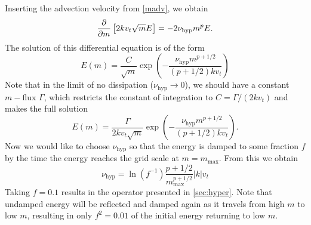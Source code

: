 \documentclass{jpp}
\begin{document}
{Inserting the advection velocity from \cref{madv}, we obtain
\begin{equation}
     \frac{\partial }{\partial m}\left[2 k v_t \sqrt{m} E\right] = - 2 \nu_\mathrm{hyp} m^p E.
\end{equation}
The solution of this differential equation is of the form
\begin{equation}
    E(m) = \frac{C}{\sqrt{m}} \exp\left({-\frac{\nu_\mathrm{hyp} m^{p+1/2}}{(p+1/2)k v_t}}\right)
\end{equation}
Note that in the limit of no dissipation ($\nu_\mathrm{hyp}\rightarrow 0$), we should have a constant $m-$flux $\Gamma$, which restricts the constant of integration to $C=\Gamma/(2k v_t)$ and makes the full solution
\begin{equation}
    E(m) = \frac{\Gamma}{2k v_t\sqrt{m}} \exp\left({-\frac{\nu_\mathrm{hyp} m^{p+1/2}}{(p+1/2)k v_t}}\right).
\end{equation}
Now we would like to choose $\nu_\mathrm{hyp}$ so that the energy is damped to some fraction $f$ by the time the energy reaches the grid scale at $m=m_\mathrm{max}$. From this we obtain
\begin{equation}
    \nu_\mathrm{hyp} = \ln(f^{-1}) \frac{p+1/2}{m_\mathrm{max}^{p+1/2}}|k|v_t
\end{equation}
Taking $f=0.1$ results in the operator presented in \cref{sec:hyper}. Note that undamped energy will be reflected and damped again as it travels from high $m$ to low $m$, resulting in only $f^2=0.01$ of the initial energy returning to low $m$.
}
\end{document}
